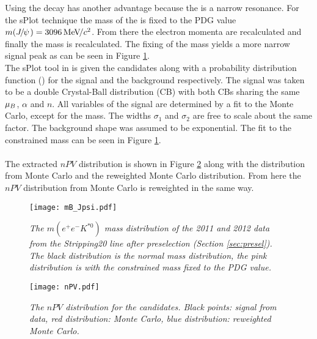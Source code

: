 Using the \BdToJPsieeKst decay has another advantage because the \jpsi is a narrow resonance. For the sPlot technique the mass of the \jpsi is fixed to the PDG value $m({J\mskip -3mu/\mskip -2mu\psi\mskip 2mu}) = 3096 {\mathrm{\,Me\kern -0.1em V\!/}c^2}$. From there the electron momenta are recalculated and finally the \Bd mass is recalculated. The fixing of the \jpsi mass yields a more narrow signal peak as can be seen in Figure \ref{fig:jpsi}.\\
The sPlot tool in \root is given the \BdToJPsieeKst candidates along with a probability distribution function (\PDF) for the signal and the background respectively. The signal \PDF was taken to be a double Crystal-Ball distribution (CB) \cite{crystal} with both CBs sharing the same $\mu_{B}$, $\alpha$ and $n$. All variables of the signal \PDF are determined by a fit to the \BdToJPsieeKst Monte Carlo, except for the \Bd mass. The widths $\sigma_1$ and $\sigma_2$ are free to scale about the same factor. The background shape was assumed to be exponential. The fit to the constrained \Bd mass can be seen in Figure \ref{fig:jpsi}.\\
\\
The extracted $nPV$ distribution is shown in Figure \ref{fig:npv} along with the distribution from Monte Carlo and the reweighted Monte Carlo distribution. From here the $nPV$ distribution from \BdKstee Monte Carlo is reweighted in the same way.
\begin{figure}[ht]
\vspace*{-0.5cm}
\begin{center}
\texttt{[image: mB\_Jpsi.pdf]}
\end{center}
\vspace*{-0.8cm}
\caption{\textit{The $m(e^{+}e^{-}K^{*0})$ mass distribution of the 2011 and 2012 \lhcb data from the Stripping20 \BdToJPsieeKst line after preselection (Section \ref{sec:presel}). The black distribution is the normal \Bd mass distribution, the pink distribution is with the constrained \jpsi mass fixed to the PDG value.}}
\label{fig:jpsi}
\end{figure}

\begin{figure}[ht]
\begin{center}
\texttt{[image: nPV.pdf]}
\end{center}
\vspace*{-0.8cm}
\caption{\textit{The $nPV$ distribution for the \BdToJPsieeKst candidates. Black points: signal from \lhcb data, red distribution: Monte Carlo, blue distribution: reweighted Monte Carlo.}}
\label{fig:npv}
\end{figure}


